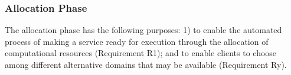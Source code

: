 


\subsubsection*{Allocation Phase}\label{sec:A3-E-allocation}

The allocation phase has the following purposes: 1) to enable the automated process of making a service ready for execution through the allocation of computational resources (Requirement R1); and to enable clients to choose among different alternative domains that may be available (Requirement Ry).
 



